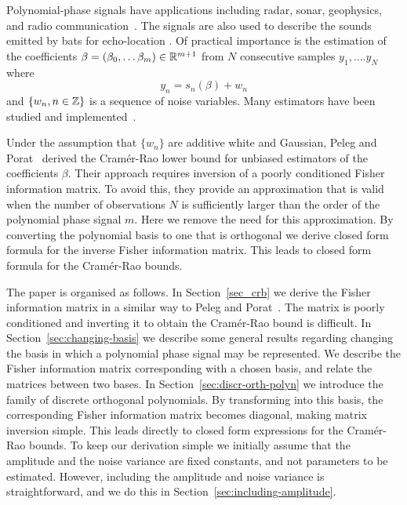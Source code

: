 \documentclass[journal,10pt]{IEEEtran}
\begin{document}
Polynomial-phase signals have applications including radar, sonar, geophysics, and radio communication~\cite{Angeby_estimating_2000}.  The signals are also used to describe the sounds emitted by bats for echo-location \cite{Peleg_DPT_1995}.  Of practical importance is the estimation of the coefficients $\beta = (\beta_0, \dots \beta_m)\in{\mathbb R}^{m+1}$ from $N$ consecutive samples $y_1, \dots. y_N$ where 
\begin{equation}\label{eq:yndatamodel}
y_n = s_n(\beta) + w_n
\end{equation}
and $\{w_n, n \in {\mathbb Z}\}$ is a sequence of noise variables.  Many estimators have been studied and implemented~\cite{Peleg_DPT_1995, Angeby_estimating_2000, Djuric_phase_unwrap_chirp_1990, Oshea_iterative_1996, Barbarossa_analysis_of_PPS_1997, Slocumb_polynomial_1994, Morelande_bayes_unwrapping_2008, Kitchen_polyphase_unwrapping_1994,Francos_2dpolyest_1998}.

Under the assumption that $\{w_n\}$ are additive white and Gaussian, Peleg and Porat~\cite{Peleg1991_CRB_PPS_1991} derived the Cram\'{e}r-Rao lower bound for unbiased estimators of the coefficients $\beta$.  Their approach requires inversion of a poorly conditioned Fisher information matrix.  To avoid this, they provide an approximation that is valid when the number of observations $N$ is sufficiently larger than the order of the polynomial phase signal $m$.  Here we remove the need for this approximation.  By converting the polynomial basis to one that is orthogonal we derive closed form formula for the inverse Fisher information matrix.  This leads to closed form formula for the Cram\'{e}r-Rao bounds.  %

The paper is organised as follows.  In Section~\ref{sec_crb} we derive the Fisher information matrix in a similar way to Peleg and Porat~\cite{Peleg1991_CRB_PPS_1991}.  The matrix is poorly conditioned and inverting it to obtain the Cram\'{e}r-Rao bound is difficult.  In Section~\ref{sec:changing-basis} we describe some general results regarding changing the basis in which a polynomial phase signal may be represented.  We describe the Fisher information matrix corresponding with a chosen basis, and relate the matrices between two bases.  In Section~\ref{sec:discr-orth-polyn} we introduce the family of discrete orthogonal polynomials.  By transforming into this basis, the corresponding Fisher information matrix becomes diagonal, making matrix inversion simple.  This leads directly to closed form expressions for the Cram\'{e}r-Rao bounds.  To keep our derivation simple we initially assume that the amplitude and the noise variance are fixed constants, and not parameters to be estimated.  However, including the amplitude and noise variance is straightforward, and we do this in Section~\ref{sec:including-amplitude}.  %
\end{document}
